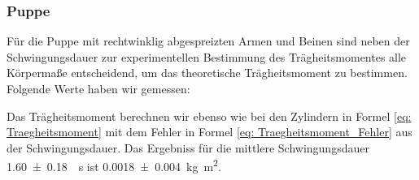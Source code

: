 \subsubsection*{Puppe}
Für die Puppe mit rechtwinklig abgespreizten Armen und Beinen sind neben der Schwingungsdauer zur experimentellen Bestimmung des Trägheitsmomentes alle Körpermaße entscheidend, um das theoretische Trägheitsmoment zu bestimmen. Folgende Werte haben wir gemessen:

Das Trägheitsmoment berechnen wir ebenso wie bei den Zylindern in Formel \eqref{eq: Traegheitsmoment}
mit dem Fehler in Formel \eqref{eq: Traegheitsmoment_Fehler} aus der Schwingungsdauer.
Das Ergebniss für die mittlere Schwingungsdauer \SI{1,60 \pm 0,18}{\per\second} ist \SI{0,0018 \pm 0,004}{\kilo\gram\meter\squared}. \linebreak %


